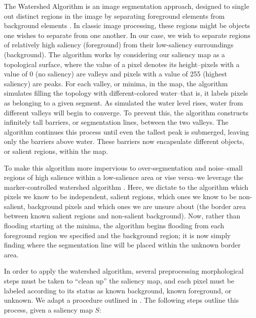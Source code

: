 The Watershed Algorithm is an image segmentation approach, designed to single out distinct regions in the image by separating foreground elements from background elements \cite{barnes2014priority}. In classic image processing, these regions might be objects one wishes to separate from one another. In our case, we wish to separate regions of relatively high saliency (foreground) from their low-saliency surroundings (background). The algorithm works by considering our saliency map as a topological surface, where the value of a pixel denotes its height--pixels with a value of 0 (no saliency) are valleys and pixels with a value of 255 (highest saliency) are peaks. For each valley, or minima, in the map, the algorithm simulates filling the topology with different-colored water--that is, it labels pixels as belonging to a given segment. As simulated the water level rises, water from different valleys will begin to converge. To prevent this, the algorithm constructs infinitely tall barriers, or segmentation lines, between the two valleys. The algorithm continues this process until even the tallest peak is submerged, leaving only the barriers above water. These barriers now encapsulate different objects, or salient regions, within the map. 

To make this algorithm more impervious to over-segmentation and noise--small regions of high salience within a low-salience area or vise versa--we leverage the marker-controlled watershed algorithm \cite{roerdink2000watershed}. Here, we dictate to the algorithm which pixels we know to be independent, salient regions, which ones we know to be non-salient, background pixels and which ones we are unsure about (the border area between known salient regions and non-salient background). Now, rather than flooding starting at the minima, the algorithm begins flooding from each foreground region we specified and the background region; it is now simply finding where the segmentation line will be placed within the unknown border area.

In order to apply the watershed algorithm, several preprocessing morphological steps must be taken to “clean up” the saliency map, and each pixel must be labeled according to its status as known background, known foreground, or unknown. We adapt a procedure outlined in \cite{opencv_2017}. The following steps outline this process, given a saliency map $S$:

